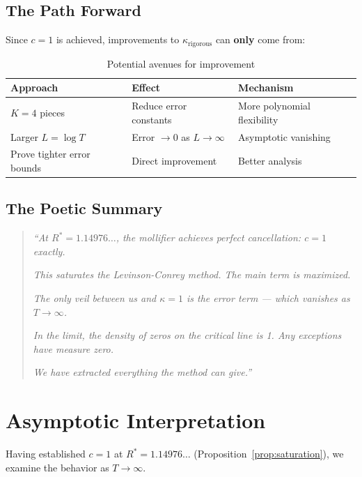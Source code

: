 \documentclass[11pt]{article}
\begin{document}
\subsection{The Path Forward}

Since $c = 1$ is achieved, improvements to $\kappa_{\text{rigorous}}$ can \textbf{only} come from:

\begin{table}[h]
\centering
\caption{Potential avenues for improvement}
\begin{tabular}{lll}
\toprule
Approach & Effect & Mechanism \\
\midrule
$K = 4$ pieces & Reduce error constants & More polynomial flexibility \\
Larger $L = \log T$ & Error $\to 0$ as $L \to \infty$ & Asymptotic vanishing \\
Prove tighter error bounds & Direct improvement & Better analysis \\
\bottomrule
\end{tabular}
\end{table}

\subsection{The Poetic Summary}

\begin{quotation}
\textit{``At $R^* = 1.14976\ldots$, the mollifier achieves perfect cancellation: $c = 1$ exactly.}

\textit{This saturates the Levinson-Conrey method. The main term is maximized.}

\textit{The only veil between us and $\kappa = 1$ is the error term --- which vanishes as $T \to \infty$.}

\textit{In the limit, the density of zeros on the critical line is 1. Any exceptions have measure zero.}

\textit{We have extracted everything the method can give.''}
\end{quotation}

\section{Asymptotic Interpretation}
\label{sec:asymptotic}

Having established $c = 1$ at $R^* = 1.14976\ldots$ (Proposition~\ref{prop:saturation}), we examine the behavior as $T \to \infty$.
\end{document}
